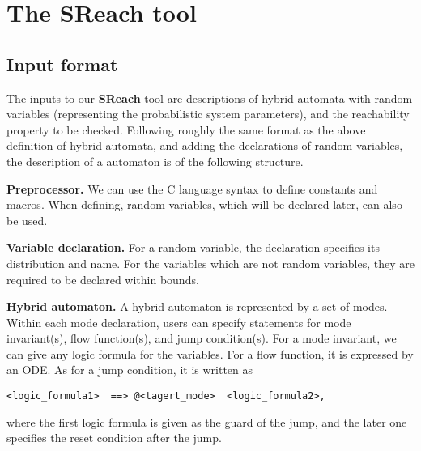 \section{The SReach tool}\label{apndx:usage}
\subsection{Input format}
The inputs to our {\bf SReach} tool are descriptions of hybrid automata with random variables (representing the probabilistic system parameters), and the reachability property to be checked. Following roughly the same format as the above definition of hybrid automata, and adding the declarations of random variables, the description of a automaton is of the following structure.

{\bf Preprocessor.} We can use the C language syntax to define constants and macros. When defining, random variables, which will be declared later, can also be used. 

\begin{comment}
For example, we can write,\\

$\#define\;\; x \;\;2.0$\\
$\#define\;\; y\;\; (z^2 \;+\; 1)$\\

where $z$ can be a random variable.\\
\end{comment}

{\bf Variable declaration.} For a random variable, the declaration specifies its distribution and name. For the variables which are not random variables, they are required to be declared within bounds. 
\begin{comment}
with the format - $Dist \; \; var_nam;$, where currently "$Dist$" can be "$B(p)$" (Bernoulli distribution), "$U(p, \;q)$" (Uniform distribution), "$N(p, \;q)$" (Gaussian distribution), and "$E(p)$" (Exponential distribution). $p$ and $q$ are parameters for these distributions. (Note: it is easy to include additional distributions if needed.)

For instance,\\
$[-10, \; 20.1]\; \;  x;$\\
\end{comment}

{\bf Hybrid automaton.} A hybrid automaton is represented by a set of modes. Within each mode declaration, users can specify statements for mode invariant(s), flow function(s), and jump condition(s). For a mode invariant, we can give any logic formula for the variables. For a flow function, it is expressed by an ODE.  As for a jump condition, it is written as 
\begin{verbatim} 
<logic_formula1>  ==> @<tagert_mode>  <logic_formula2>,
\end{verbatim}
where the first logic formula is given as the guard of the jump, and the later one specifies the reset condition after the jump.

